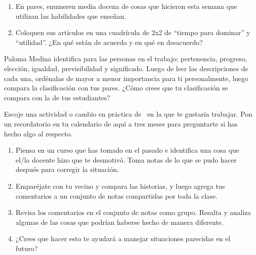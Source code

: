 

\begin{enumerate}

\item
  En pares,
  enumeren media docena de cosas que hicieron esta semana que utilizan las habilidades que enseñan.

\item
  Coloquen sus artículos en una cuadrícula de 2x2 de ``tiempo para dominar'' y ``utilidad''.
  ¿En qué están de acuerdo y en qué en desacuerdo?

\end{enumerate}


Paloma Medina identifica  para las personas en el trabajo:
pertenencia,
progreso,
elección,
igualdad,
previsibilidad
y significado.
Luego de leer las descripciones de cada una,
ordénalas de mayor a menor importancia para ti personalmente,
luego compara la clasificación con tus pares.
¿Cómo crees que tu clasificación se compara con la de tus estudiantes?


Escoje una actividad o cambio en práctica de~\cite{Lee2017} en la que te gustaría trabajar.
Pon un recordatorio en tu calendario de aquí a tres meses
para preguntarte si has hecho algo al respecto.


\begin{enumerate}
\item
  Piensa en un curso que has tomado en el pasado
  e identifica una cosa que el/la docente hizo que te desmotivó.
  Toma notas de lo que se pudo hacer después para corregir la situación.
\item
  Emparéjate con tu vecino y compara las historias,
  y luego agrega tus comentarios a un conjunto de notas compartidas por toda la clase.
\item
  Revisa los comentarios en el conjunto de notas como grupo.
  Resalta y analiza algunas de las cosas que podrían haberse hecho de manera diferente.
\item
  ¿Crees que hacer esto te ayudará a manejar situaciones parecidas en el futuro?
\end{enumerate}

